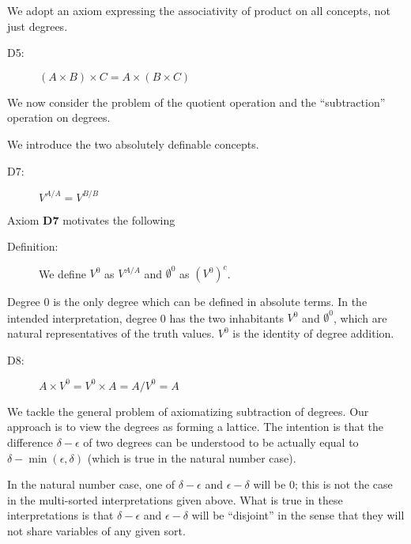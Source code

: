 \documentclass{article}
\begin{document}
We adopt an axiom expressing the associativity of product on all
concepts, not just degrees.
\begin{description}
\item[D5:]  $(A \times B) \times C = A \times (B \times C)$
\end{description}

We now consider the problem of the quotient operation and the
``subtraction'' operation on degrees.

We introduce the two absolutely definable concepts.

\begin{description}

\item[D7:]  $V^{A/A} = V^{B/B}$

\end{description}
Axiom {\bf D7} motivates the following

\begin{description}

\item[Definition:]

We define $V^0$ as $V^{A/A}$ and $\emptyset^0$ as $(V^0)^c$.

\end{description}
Degree 0 is the only degree which can be defined in absolute terms.
In the intended interpretation, degree 0 has the two inhabitants $V^0$
and $\emptyset^0$, which are natural representatives of the truth
values.  $V^0$ is the identity of degree addition.

\begin{description}

\item[D8:] $A \times V^0 = V^0 \times A = A/V^0 = A$

\end{description}

We tackle the general problem of axiomatizing subtraction of degrees.
Our approach is to view the degrees as forming a lattice.  The
intention is that the difference $\delta - \epsilon$ of two degrees
can be understood to be actually equal to $\delta -
\min(\epsilon,\delta)$ (which is true in the natural number case).

In the natural number case, one of $\delta - \epsilon$ and $\epsilon -
\delta$ will be 0; this is not the case in the multi-sorted
interpretations given above.  What is true in these interpretations is
that $\delta - \epsilon$ and $\epsilon - \delta$ will be ``disjoint''
in the sense that they will not share variables of any given sort.
\end{document}
